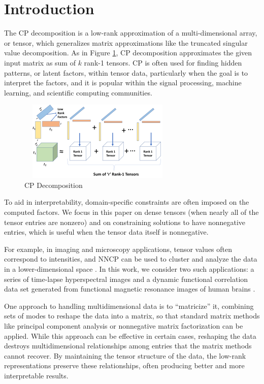 
\section{Introduction}

The CP decomposition is a low-rank approximation of a multi-dimensional array, or tensor, which generalizes matrix approximations like the truncated singular value decomposition. As in Figure \ref{fig:cpdecomposition}, CP decomposition approximates the given input matrix as sum of $k$ rank-1 tensors.  CP is often used for finding hidden patterns, or latent factors, within tensor data, particularly when the goal is to interpret the factors, and it is popular within the signal processing, machine learning, and scientific computing communities.

\begin{figure}[htbp]
\begin{center}
\includegraphics[width=3in, height=1.5in]{fig/cpdecomposition.pdf}
\caption{CP Decomposition}
\label{fig:cpdecomposition}
\end{center}
\end{figure}


To aid in interpretability, domain-specific constraints are often imposed on the computed factors.
We focus in this paper on dense tensors (when nearly all of the tensor entries are nonzero) and on constraining solutions to have nonnegative entries, which is useful when the tensor data itself is nonnegative. 

For example, in imaging and microscopy applications, tensor values often correspond to intensities, and NNCP can be used to cluster and analyze the data in a lower-dimensional space \cite{JC+16}.
In this work, we consider two such applications: a series of time-lapse hyperspectral images \cite{FAN16} and a dynamic functional correlation data set generated from functional magnetic resonance images of human brains \cite{VEU+12}.

One approach to handling multidimensional data is to ``matricize'' it, combining sets of modes to reshape the data into a matrix, so that standard matrix  methods like principal component analysis or nonnegative matrix factorization can be applied.
While this approach can be effective in certain cases, reshaping the data destroys multidimensional relationships among entries that the matrix methods cannot recover.
By maintaining the tensor structure of the data, the low-rank representations preserve these relationships, often producing better and more interpretable results.

